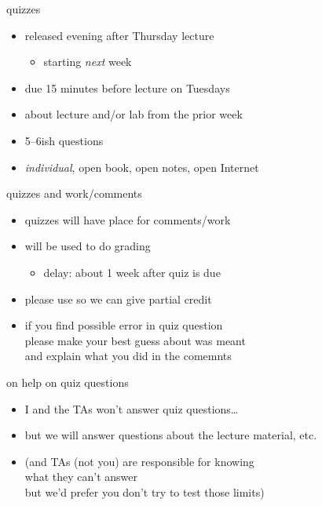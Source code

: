 \begin{frame}{quizzes}
    \begin{itemize}
    \item released evening after Thursday lecture
        \begin{itemize}
        \item starting \textit{next} week
        \end{itemize}
    \item due 15 minutes before lecture on Tuesdays
    \vspace{.5cm}
    \item about lecture and/or lab from the prior week
    \item 5--6ish questions
    \item \textit{individual}, open book, open notes, open Internet
    \end{itemize}
\end{frame}

\begin{frame}{quizzes and work/comments}
    \begin{itemize}
    \item quizzes will have place for comments/work
    \vspace{.5cm}
    \item will be used to do grading
        \begin{itemize}
        \item delay: about 1 week after quiz is due
        \end{itemize}
    \item please use so we can give partial credit
    \item if you find possible error in quiz question \\
        please make your best guess about was meant \\
        and explain what you did in the comemnts
    \end{itemize}
\end{frame}

\begin{frame}{on help on quiz questions}
    \begin{itemize}
    \item I and the TAs won't answer quiz questions\ldots
    \item but we will answer questions about the lecture material, etc.
    \vspace{.5cm}
    \item (and TAs (not you) are responsible for knowing \\
        what they can't answer \\
        but we'd prefer you don't try to test those limits)
    \end{itemize}
\end{frame}

